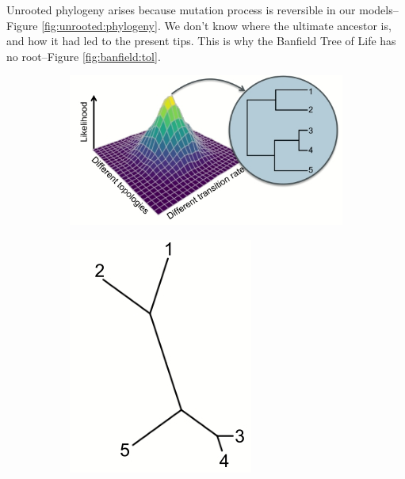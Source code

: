 \documentclass[]{article}
\begin{document}
Unrooted phylogeny arises because mutation process is reversible in our models--Figure \ref{fig:unrooted:phylogeny}. We don't know where the ultimate ancestor is, and how it had led to the present tips. This is why the Banfield Tree of Life has no root--Figure \ref{fig:banfield:tol}.
 
\begin{figure}[H]
	\caption[Unrooted phylogeny arises because mutation process is reversible]{Unrooted phylogeny arises because mutation process is reversible in our models}\label{fig:unrooted:phylogeny}
	\begin{subfigure}[b]{0.45\textwidth}
		\includegraphics[width=\textwidth]{InferringPastHard1}
	\end{subfigure}
	\begin{subfigure}[b]{0.45\textwidth}
		\includegraphics[width=\textwidth]{InferringPastHard2}
	\end{subfigure}
\end{figure}
\end{document}

